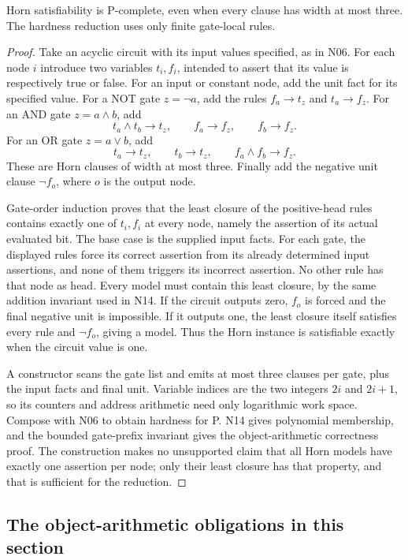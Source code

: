 \begin{theorem}\label{thm:N22}
Horn satisfiability is P-complete, even when every clause has width at most
three. The hardness reduction uses only finite gate-local rules.
\end{theorem}
\begin{proof}
Take an acyclic circuit with its input values specified, as in N06. For each
node $i$ introduce two variables $t_i,f_i$, intended to assert that its value
is respectively true or false. For an input or constant node, add the unit
fact for its specified value. For a NOT gate $z=\neg a$, add the rules
$f_a\to t_z$ and $t_a\to f_z$. For an AND gate $z=a\wedge b$, add
\[
 t_a\wedge t_b\to t_z,\qquad f_a\to f_z,\qquad f_b\to f_z.
\]
For an OR gate $z=a\vee b$, add
\[
 t_a\to t_z,\qquad t_b\to t_z,\qquad f_a\wedge f_b\to f_z.
\]
These are Horn clauses of width at most three. Finally add the negative unit
clause $\neg f_o$, where $o$ is the output node.

Gate-order induction proves that the least closure of the positive-head
rules contains exactly one of $t_i,f_i$ at every node, namely the assertion
of its actual evaluated bit. The base case is the supplied input facts.
For each gate, the displayed rules force its correct assertion from its
already determined input assertions, and none of them triggers its incorrect
assertion. No other rule has that node as head. Every model must contain
this least closure, by the same addition invariant used in N14. If the
circuit outputs zero, $f_o$ is forced and the final negative unit is
impossible. If it outputs one, the least closure itself satisfies every
rule and $\neg f_o$, giving a model. Thus the Horn instance is satisfiable
exactly when the circuit value is one.

A constructor scans the gate list and emits at most three clauses per gate,
plus the input facts and final unit. Variable indices are the two integers
$2i$ and $2i+1$, so its counters and address arithmetic need only logarithmic
work space. Compose with N06 to obtain hardness for P. N14 gives polynomial
membership, and the bounded gate-prefix invariant gives the object-arithmetic
correctness proof. The construction makes no unsupported claim that all
Horn models have exactly one assertion per node; only their least closure
has that property, and that is sufficient for the reduction.
\end{proof}

\subsection{The object-arithmetic obligations in this section}

